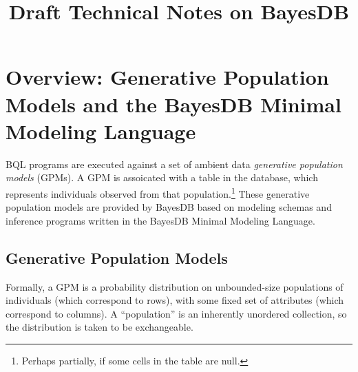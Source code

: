 \documentclass[10pt,letterpaper]{article}
\title{Draft Technical Notes on BayesDB}
\begin{document}
\maketitle




\section{Overview: Generative Population Models and the BayesDB Minimal Modeling Language}
\label{sec:overview}

BQL programs are executed against a set of ambient data
\textit{generative population models} (GPMs).  A GPM is assoicated
with a table in the database, which represents individuals observed
from that population.\footnote{Perhaps partially, if some cells in the
  table are null.} These generative population models are provided by
BayesDB based on modeling schemas and inference programs written in
the BayesDB Minimal Modeling Language.

\subsection{Generative Population Models}

Formally, a GPM is a probability distribution on unbounded-size
populations of individuals (which correspond to rows), with some fixed
set of attributes (which correspond to columns). A ``population'' is
an inherently unordered collection, so the distribution is taken to be
exchangeable.
\end{document}
